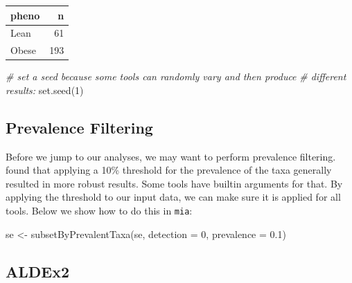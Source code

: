 \documentclass[
]{book}
\newenvironment{Shaded}{\begin{snugshade}}{\end{snugshade}}
\newcommand{\AttributeTok}[1]{\textcolor[rgb]{0.77,0.63,0.00}{#1}}
\newcommand{\CommentTok}[1]{\textcolor[rgb]{0.56,0.35,0.01}{\textit{#1}}}
\newcommand{\DecValTok}[1]{\textcolor[rgb]{0.00,0.00,0.81}{#1}}
\newcommand{\FloatTok}[1]{\textcolor[rgb]{0.00,0.00,0.81}{#1}}
\newcommand{\FunctionTok}[1]{\textcolor[rgb]{0.00,0.00,0.00}{#1}}
\newcommand{\NormalTok}[1]{#1}
\newcommand{\OtherTok}[1]{\textcolor[rgb]{0.56,0.35,0.01}{#1}}
\begin{document}
\begin{tabular}{l|r}
\hline
pheno & n\\
\hline
Lean & 61\\
\hline
Obese & 193\\
\hline
\end{tabular}

\begin{Shaded}
\begin{Highlighting}[]
\CommentTok{\# set a seed because some tools can randomly vary and then produce }
\CommentTok{\# different results:}
\FunctionTok{set.seed}\NormalTok{(}\DecValTok{1}\NormalTok{)}
\end{Highlighting}
\end{Shaded}

\hypertarget{prevalence-filtering}{%
\subsection{Prevalence Filtering}\label{prevalence-filtering}}

Before we jump to our analyses, we may want to perform prevalence filtering.
\citet{nearingMicrobiomeDifferentialAbundance2021} found that applying a 10\% threshold for the prevalence of
the taxa generally resulted in more robust results. Some tools have builtin
arguments for that. By applying the threshold to our input data, we can make
sure it is applied for all tools. Below we show how to do this in \texttt{mia}:

\begin{Shaded}
\begin{Highlighting}[]
\NormalTok{se }\OtherTok{\textless{}{-}} \FunctionTok{subsetByPrevalentTaxa}\NormalTok{(se, }\AttributeTok{detection =} \DecValTok{0}\NormalTok{, }\AttributeTok{prevalence =} \FloatTok{0.1}\NormalTok{)}
\end{Highlighting}
\end{Shaded}

\hypertarget{aldex2}{%
\subsection{ALDEx2}\label{aldex2}}
\end{document}
